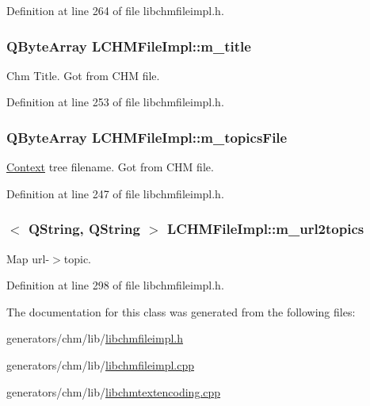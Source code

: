 Definition at line 264 of file libchmfileimpl.\+h.

\hypertarget{classLCHMFileImpl_abe88f8991855d7d573bd2966f9fd9f8b}{
\subsubsection[{m\+\_\+title}]{\setlength{\rightskip}{0pt plus 5cm}Q\+Byte\+Array L\+C\+H\+M\+File\+Impl\+::m\+\_\+title}}\label{classLCHMFileImpl_abe88f8991855d7d573bd2966f9fd9f8b}


Chm Title. Got from C\+H\+M file. 



Definition at line 253 of file libchmfileimpl.\+h.

\hypertarget{classLCHMFileImpl_af3d33a88f44e3d103f08d9cc1c0ccf12}{
\subsubsection[{m\+\_\+topics\+File}]{\setlength{\rightskip}{0pt plus 5cm}Q\+Byte\+Array L\+C\+H\+M\+File\+Impl\+::m\+\_\+topics\+File}}\label{classLCHMFileImpl_af3d33a88f44e3d103f08d9cc1c0ccf12}


\hyperlink{classContext}{Context} tree filename. Got from C\+H\+M file. 



Definition at line 247 of file libchmfileimpl.\+h.

\hypertarget{classLCHMFileImpl_ace36f0ffc8316cb551fb236989552620}{
\subsubsection[{m\+\_\+url2topics}]{$<$ Q\+String, Q\+String $>$ L\+C\+H\+M\+File\+Impl\+::m\+\_\+url2topics}}\label{classLCHMFileImpl_ace36f0ffc8316cb551fb236989552620}


Map url-\/$>$topic. 



Definition at line 298 of file libchmfileimpl.\+h.



The documentation for this class was generated from the following files\+:\begin{DoxyCompactItemize}
\item 
generators/chm/lib/\hyperlink{libchmfileimpl_8h}{libchmfileimpl.\+h}\item 
generators/chm/lib/\hyperlink{libchmfileimpl_8cpp}{libchmfileimpl.\+cpp}\item 
generators/chm/lib/\hyperlink{libchmtextencoding_8cpp}{libchmtextencoding.\+cpp}\end{DoxyCompactItemize}
